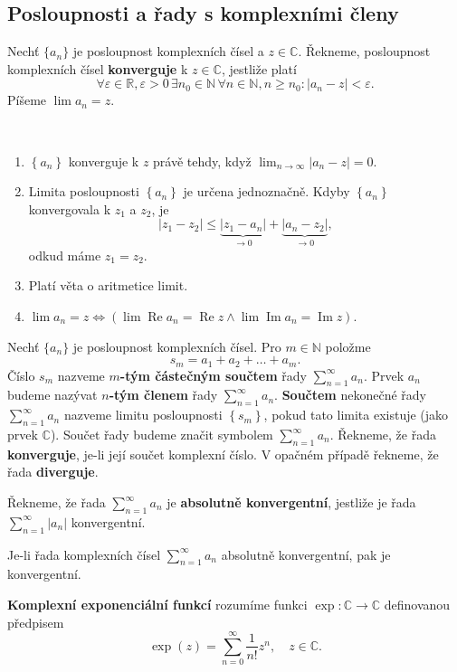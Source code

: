 \subsection{Posloupnosti a řady s komplexními členy}
\begin{definice}
Nechť $\{a_n\}$ je posloupnost komplexních čísel a $z \in \mathbb{C}$. Řekneme, posloupnost
komplexních čísel \textbf{konverguje} k $z\in \mathbb C $, jestliže platí
\[
\forall \varepsilon \in \mathbb R , \varepsilon > 0 \,\exists n_0 \in \mathbb N  \, \forall n \in \mathbb N ,n \geq n_0: |a_n - z| < \varepsilon.
\]
Píšeme $\lim a_n = z$.
\end{definice}

\begin{poznamka}
	\,
	\begin{enumerate}[(1)]
		\item $\left \{ a_n \right \} $ konverguje k $z$ právě tehdy, když $\lim_{n\to \infty} |a_n - z|=0$.
		\item Limita posloupnosti $\left \{ a_n \right \} $ je určena jednoznačně. Kdyby
		$\left \{ a_n \right \} $ konvergovala k $z_1$ a $z_2$, je
		$$
		    |z_1 -z_2| \leq \underbrace{|z_1-a_n|}_{\to 0} + \underbrace{|a_n-z_2|}_{\to 0},
		$$
		odkud máme $z_1=z_2$.
		\item Platí věta o aritmetice limit.
		\item $\lim a_n = z \iff (\lim \operatorname{Re} a_n = \operatorname{Re} z \land \lim \operatorname{Im}  a_n = \operatorname{Im} z)$.
	\end{enumerate}
\end{poznamka}

\begin{definice}
Nechť $\{a_n\}$ je posloupnost komplexních čísel. Pro $m\in \mathbb N $ položme
$$
s_m = a_1+a_2+\dots +a_m.
$$
Číslo $s_m$ nazveme \textbf{$m$-tým částečným součtem} řady $\sum_{n=1}^\infty a_n$. Prvek $a_n$ budeme nazývat
\textbf{$n$-tým členem} řady $\sum_{n=1}^\infty a_n$. \textbf{Součtem} nekonečné řady $\sum_{n=1}^\infty a_n$
nazveme limitu posloupnosti $\left \{ s_m \right \} $, pokud tato limita existuje (jako prvek $\mathbb C $).
Součet řady budeme značit symbolem $\sum_{n=1}^\infty a_n$. Řekneme, že řada \textbf{konverguje}, je-li její
součet komplexní číslo. V opačném případě řekneme, že řada \textbf{diverguje}.
\end{definice}

\begin{definice}
Řekneme, že řada $\sum_{n=1}^{\infty} a_n$ je \textbf{absolutně konvergentní}, jestliže
je řada $\sum_{n=1}^{\infty} |a_n|$ konvergentní.
\end{definice}

\begin{veta}\label{veta7.17}
Je-li řada komplexních čísel $\sum_{n=1}^{\infty} a_n$ absolutně konvergentní, pak je konvergentní.
\end{veta}

\begin{definice}
\textbf{Komplexní exponenciální funkcí} rozumíme funkci $\exp: \mathbb C \to \mathbb C$ definovanou
předpisem
\[
\exp(z) = \sum_{n=0}^{\infty} \frac{1}{n!} z^n, \quad z \in \mathbb{C}.
\]
\end{definice}
